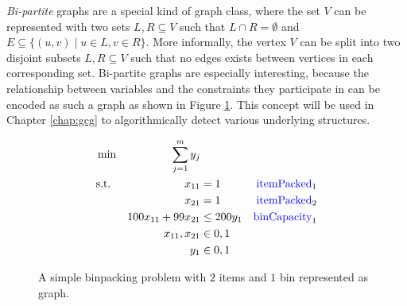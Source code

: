 		\textit{Bi-partite} graphs are a special kind of graph class, where the set $V$ can be represented with two sets $L, R \subseteq V$ such that $L \cap R = \emptyset$ and $E \subseteq \{ (u, v) \mid u \in L, v \in R \}$.
		More informally, the vertex $V$ can be split into two disjoint subsets $L, R \subseteq V$ such that no edges exists between vertices in each corresponding set.
		Bi-partite graphs are especially interesting, because the relationship between variables and the constraints they participate in can be encoded as such a graph as shown in Figure \ref{fig:prelims:graphs:binpackbipartite}. This concept will be used in Chapter \ref{chap:gcg} to algorithmically detect various underlying structures. 
		\begin{figure}[ht!]
			\centering
			\begin{minipage}{0.47\textwidth}
				
			\end{minipage}
			\begin{minipage}{0.47\textwidth}
				\begin{align}
					&\min &\sum_{j=1}^m y_j \nonumber \\
					&\text{s.t.} &x_{11} &= 1 & \text{\textcolor{blue}{itemPacked}}_1 \nonumber \\
					&& x_{21} &= 1 & \text{\textcolor{blue}{itemPacked}}_2\nonumber \\
					&& 100 x_{11} + 99 x_{21} &\leq 200 y_1 & \text{\textcolor{blue}{binCapacity}}_1\nonumber \\
					&& x_{11}, x_{21} &\in { 0, 1 }  \nonumber \\
					&& y_1 &\in { 0, 1 } \nonumber
				\end{align}
			\end{minipage}
			\caption{A simple binpacking problem with $2$ items and $1$ bin represented as  graph.}
			\label{fig:prelims:graphs:binpackbipartite}
		\end{figure}
	
		\clearpage
	
